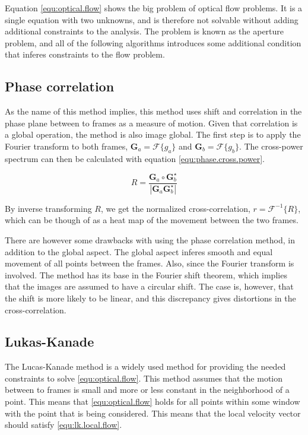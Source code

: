 Equation \eqref{equ:optical.flow} shows the big problem of optical flow problems. It is a single equation with two unknowns, and is therefore not 
solvable without adding additional constraints to the analysis. The problem is known as the aperture problem, and all of the following algorithms 
introduces some additional condition that inferes constraints to the flow problem.

\subsection{Phase correlation}
As the name of this method implies, this method uses shift and correlation in the phase plane between to frames as a measure of motion. Given that correlation is a global operation,
the method is also image global. The first step is to apply the Fourier transform to both frames, $\textbf{G}_a = \mathcal{F}\{g_a\}$ and $\textbf{G}_b = \mathcal{F}\{g_b\}$. The cross-power spectrum 
can then be calculated with equation \eqref{equ:phase.cross.power}.

\begin{equation}\label{equ:phase.cross.power}
R = \frac{\textbf{G}_a \circ \textbf{G}_b^\star}{|\textbf{G}_a \textbf{G}_b^\star|}
\end{equation}

By inverse transforming $R$, we get the normalized cross-correlation, $r = \mathcal{F}^{-1}\{R\}$, which can be though of as a 
heat map of the movement between the two frames.

There are however some drawbacks with using the phase correlation method, in addition to the global aspect. The global aspect 
inferes smooth and equal movement of all points between the frames. Also, since the Fourier transform is involved. The method has its base 
in the Fourier shift theorem, which implies that the images are assumed to have a circular shift. The case is, however, that the shift 
is more likely to be linear, and this discrepancy gives distortions in the cross-correlation.

\subsection{Lukas-Kanade}
The Lucas-Kanade method is a widely used method for providing the needed constraints to solve \eqref{equ:optical.flow}. This method assumes that 
the motion between to frames is small and more or less constant in the neighborhood of a point. This means that \eqref{equ:optical.flow} holds for all points within some window
with the point that is being considered. This means that the local velocity vector should satisfy \eqref{equ:lk.local.flow}.

